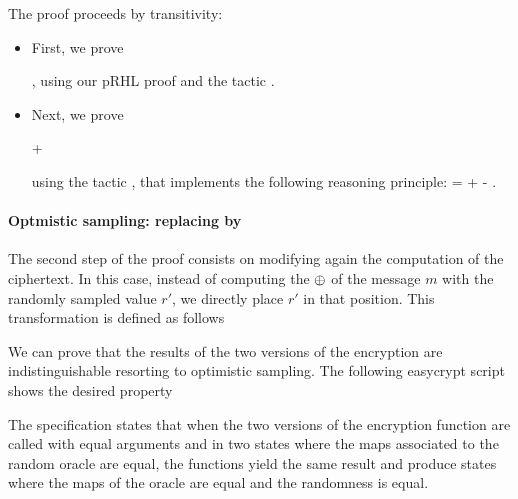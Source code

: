 
The proof proceeds by transitivity:
\begin{itemize}
\item First, we prove 

,
using our pRHL proof and the tactic .

\item Next, we prove


 +


using the tactic , that implements the following reasoning
principle:
 =   +  - .
 
\end{itemize}

\paragraph{Optmistic sampling: replacing  by }
The second step of the proof consists on modifying again the
computation of the ciphertext. In this case, instead of computing the
$\oplus$ of the message $m$ with the randomly sampled value $r'$, we
directly place $r'$ in that position. This transformation is defined
as follows

We can prove that the results of the two versions of the encryption
are indistinguishable resorting to optimistic sampling. The following
easycrypt script shows the desired property


The specification states that when the two versions of the encryption
function are called with equal arguments and in two states where the
maps associated to the random oracle are equal, the functions yield
the same result and produce states where the maps of the oracle are
equal and the randomness is equal.  


